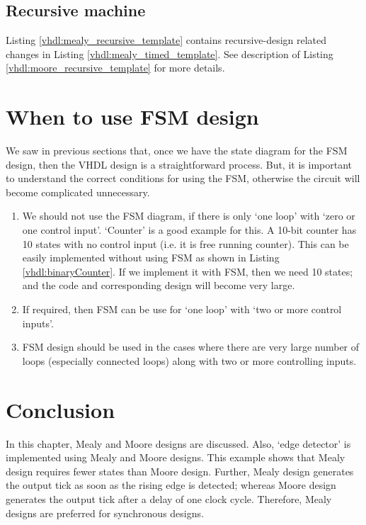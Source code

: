 \subsection{Recursive machine}

Listing \ref{vhdl:mealy_recursive_template} contains recursive-design related changes in Listing \ref{vhdl:mealy_timed_template}. See description of Listing \ref{vhdl:moore_recursive_template} for more details. 



\section{When to use FSM design}
We saw in previous sections that, once we have the state diagram for the FSM design, then the VHDL design is a straightforward process. But, it is important to understand the correct conditions for using the FSM, otherwise the circuit will become complicated unnecessary. 

\begin{enumerate}
	\item We should not use the FSM diagram, if there is only `one loop' with `zero or one control input'. `Counter' is a good example for this. A 10-bit counter has 10 states with no control input (i.e. it is free running counter). This can be easily implemented without using FSM as shown in Listing \ref{vhdl:binaryCounter}. If we implement it with FSM, then we need 10 states; and the code and corresponding design will become very large. 
	
	\item If required, then FSM can be use for `one loop' with `two or more control inputs'. 
	
	\item FSM design should be used in the cases where there are very large number of loops (especially connected loops) along with two or more controlling inputs. 
	
\end{enumerate}
\section{Conclusion}
In this chapter, Mealy and Moore designs are discussed. Also, `edge detector' is implemented using Mealy and Moore designs. This example shows that Mealy design requires fewer states than Moore design. Further, Mealy design generates the output tick as soon as the rising edge is detected; whereas Moore design generates the output tick after a delay of one clock cycle. Therefore, Mealy designs are preferred for synchronous designs. 
